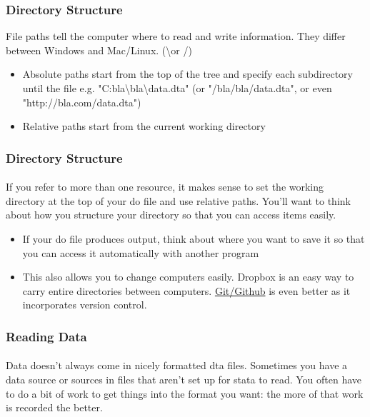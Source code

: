 \documentclass{beamer}
\begin{document}
\begin{frame}
  \frametitle{Directory Structure}
  File paths tell the computer where to read and write information. They differ between Windows and Mac/Linux. (\textbackslash or /)
  \begin{itemize}
    \item Absolute paths start from the top of the tree and specify each subdirectory until the file e.g. "C:bla\textbackslash bla\textbackslash data.dta" (or "/bla/bla/data.dta", or even "http://bla.com/data.dta")
    \item Relative paths start from the current working directory
  \end{itemize}
\end{frame}

\begin{frame}
  \frametitle{Directory Structure}
  \framesubtitle{}
  If you refer to more than one resource, it makes sense to set the working directory at the top of your do file and use relative paths. You'll want to think about how you structure your directory so that you can access items easily.
  \begin{itemize}
    \item If your do file produces output, think about where you want to save it so that you can access it automatically with another program
    \item This also allows you to change computers easily. Dropbox is an easy way to carry entire directories between computers. \href{https://desktop.github.com/}{Git/Github} is even better as it incorporates version control.
  \end{itemize}
\end{frame}

\begin{frame}
  \frametitle{Reading Data}
  \framesubtitle{}
Data doesn't always come in nicely formatted dta files. Sometimes you have a data source or sources in files that aren't set up for stata to read. You often have to do a bit of work to get things into the format you want: the more of that work is recorded the better.


\end{frame}
\end{document}
